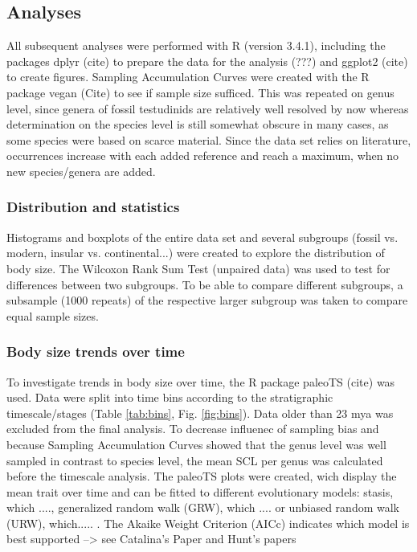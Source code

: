 \subsection{Analyses}
All subsequent analyses were performed with R (version 3.4.1), including the packages dplyr (cite) to prepare the data for the analysis (???) and ggplot2 (cite) to create figures. Sampling Accumulation Curves were created with the R package vegan (Cite) to see if sample size sufficed. This was repeated on genus level, since genera of fossil testudinids are relatively well resolved by now whereas determination on the species level is still somewhat obscure in many cases, as some species were based on scarce material. Since the data set relies on literature, occurrences increase with each added reference and reach a maximum, when no new species/genera are added.


\subsubsection{Distribution and statistics}
Histograms and boxplots of the entire data set and several subgroups (fossil vs. modern, insular vs. continental...) were created to explore the distribution of body size. The Wilcoxon Rank Sum Test (unpaired data) was used to test for differences between two subgroups. To be able to compare different subgroups, a subsample (1000 repeats) of the respective larger subgroup was taken to compare equal sample sizes. 


\subsubsection{Body size trends over time}
To investigate trends in body size over time, the R package paleoTS (cite) was used. Data were split into time bins according to the stratigraphic timescale/stages (Table \ref{tab:bins}, Fig. \ref{fig:bins}). Data older than 23 mya was excluded from the final analysis. To decrease influenec of sampling bias and because Sampling Accumulation Curves showed that the genus level was well sampled in contrast to species level, the mean SCL per genus was calculated before the timescale analysis. The paleoTS plots were created, wich display the mean trait over time and can be fitted to different evolutionary models: stasis, which ...., generalized random walk (GRW), which .... or unbiased random walk (URW), which..... . The Akaike Weight Criterion (AICc) indicates which model is best supported --> see Catalina's Paper and Hunt's papers


